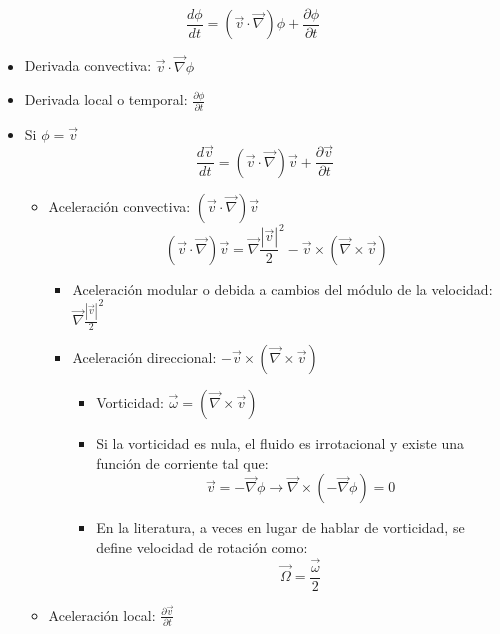 \[\frac{d\phi}{dt}=\left(\vec{v} \cdot\vec{\nabla}\right)\phi +\frac{\partial \phi}{\partial t} \]
\begin{itemize}
	\item Derivada convectiva: $\vec{v} \cdot\vec{\nabla}\phi$
	\item Derivada local o temporal: $\frac{\partial \phi}{\partial t}$
	\item Si $\phi = \vec{v}$
	\[\frac{d\vec{v}}{dt}=(\vec{v} \cdot\vec{\nabla})\vec{v}+\frac{\partial \vec v}{\partial t} \]
	\begin{itemize}
		\item Aceleración convectiva: $(\vec{v} \cdot\vec{\nabla})\vec{v}$
		\[(\vec{v} \cdot\vec{\nabla})\vec{v}=\vec{\nabla}\frac{|\vec{v}|}{2}^2-\vec{v} \times \left(\vec{\nabla}\times\vec{v}\right)\]
		\begin{itemize}
			\item Aceleración modular o debida a cambios del módulo de la velocidad: $\vec{\nabla}\frac{|\vec{v}|}{2}^2$
			\item Aceleración direccional: $-\vec{v} \times \left(\vec{\nabla}\times\vec{v}\right)$
			\begin{itemize}
				\item Vorticidad: $\vec{\omega}= \left(\vec{\nabla}\times\vec{v}\right)$
			
				\item Si la vorticidad es nula, el fluido es irrotacional y existe una función de corriente tal que:
				\[\vec{v}=-\vec{\nabla}\phi \rightarrow \vec{\nabla}\times\left(-\vec{\nabla}\phi\right)=0\]
				\item  En la literatura, a veces en lugar de hablar de vorticidad, se define velocidad de rotación como:
				\[\vec{\Omega}=\frac{\vec{\omega}}{2}\]
			\end{itemize}
		\end{itemize}
		\item Aceleración local: $\frac{\partial \vec v}{\partial t}$
	\end{itemize}
\end{itemize}
\newpage

